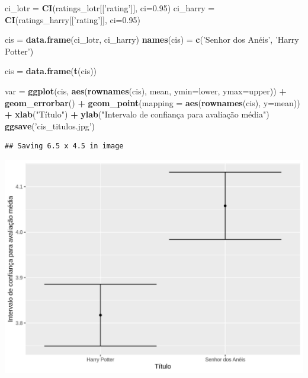 \documentclass[]{article}
\newenvironment{Shaded}{\begin{snugshade}}{\end{snugshade}}
\newcommand{\DataTypeTok}[1]{\textcolor[rgb]{0.13,0.29,0.53}{#1}}
\newcommand{\FloatTok}[1]{\textcolor[rgb]{0.00,0.00,0.81}{#1}}
\newcommand{\KeywordTok}[1]{\textcolor[rgb]{0.13,0.29,0.53}{\textbf{#1}}}
\newcommand{\NormalTok}[1]{#1}
\newcommand{\OperatorTok}[1]{\textcolor[rgb]{0.81,0.36,0.00}{\textbf{#1}}}
\newcommand{\StringTok}[1]{\textcolor[rgb]{0.31,0.60,0.02}{#1}}
\begin{document}
\begin{Shaded}
\begin{Highlighting}[]
\NormalTok{  ci_lotr =}\StringTok{ }\KeywordTok{CI}\NormalTok{(ratings_lotr[[}\StringTok{'rating'}\NormalTok{]], }\DataTypeTok{ci=}\FloatTok{0.95}\NormalTok{)}
\NormalTok{  ci_harry =}\StringTok{ }\KeywordTok{CI}\NormalTok{(ratings_harry[[}\StringTok{'rating'}\NormalTok{]], }\DataTypeTok{ci=}\FloatTok{0.95}\NormalTok{)}
  
\NormalTok{  cis =}\StringTok{ }\KeywordTok{data.frame}\NormalTok{(ci_lotr, ci_harry)}
  \KeywordTok{names}\NormalTok{(cis) =}\StringTok{ }\KeywordTok{c}\NormalTok{(}\StringTok{'Senhor dos Anéis'}\NormalTok{, }\StringTok{'Harry Potter'}\NormalTok{)}
  
\NormalTok{  cis =}\StringTok{ }\KeywordTok{data.frame}\NormalTok{(}\KeywordTok{t}\NormalTok{(cis))}
  
\NormalTok{  var =}\StringTok{ }\KeywordTok{ggplot}\NormalTok{(cis, }\KeywordTok{aes}\NormalTok{(}\KeywordTok{rownames}\NormalTok{(cis), mean, }\DataTypeTok{ymin=}\NormalTok{lower, }\DataTypeTok{ymax=}\NormalTok{upper)) }\OperatorTok{+}
\StringTok{    }\KeywordTok{geom_errorbar}\NormalTok{() }\OperatorTok{+}
\StringTok{    }\KeywordTok{geom_point}\NormalTok{(}\DataTypeTok{mapping =} \KeywordTok{aes}\NormalTok{(}\KeywordTok{rownames}\NormalTok{(cis), }\DataTypeTok{y=}\NormalTok{mean)) }\OperatorTok{+}
\StringTok{    }\KeywordTok{xlab}\NormalTok{(}\StringTok{"Título"}\NormalTok{) }\OperatorTok{+}\StringTok{ }\KeywordTok{ylab}\NormalTok{(}\StringTok{"Intervalo de confiança para avaliação média"}\NormalTok{)}
  \KeywordTok{ggsave}\NormalTok{(}\StringTok{'cis_titulos.jpg'}\NormalTok{)}
\end{Highlighting}
\end{Shaded}

\begin{verbatim}
## Saving 6.5 x 4.5 in image
\end{verbatim}

\includegraphics{./cis_titulos.jpg}
\end{document}
